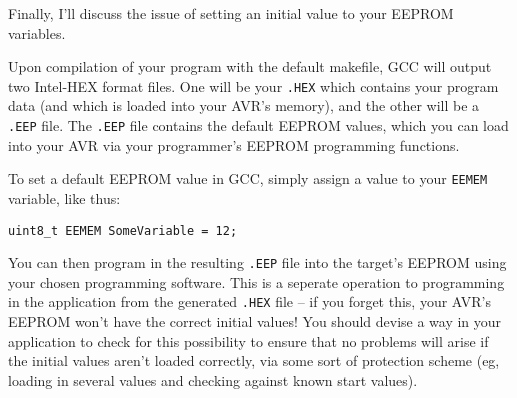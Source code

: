 \documentclass[a4paper,oneside,notitlepage]{book}
\begin{document}
Finally, I'll discuss the issue of setting an initial value to your EEPROM variables.

Upon compilation of your program with the default makefile, GCC will output two Intel-HEX format files. One will be your \texttt{.HEX} which contains your program data (and which is loaded into your AVR's memory), and the other will be a \texttt{.EEP} file. The \texttt{.EEP} file contains the default EEPROM values, which you can load into your AVR via your programmer's EEPROM programming functions.

To set a default EEPROM value in GCC, simply assign a value to your \lstinline{EEMEM} variable, like thus:

\begin{center}
\begin{lstlisting}
uint8_t EEMEM SomeVariable = 12;
\end{lstlisting}
\end{center}

You can then program in the resulting \texttt{.EEP} file into the target's EEPROM using your chosen programming software. This is a seperate operation to programming in the application from the generated \texttt{.HEX} file -- if you forget this, your AVR's EEPROM won't have the correct initial values! You should devise a way in your application to check for this possibility to ensure that no problems will arise if the initial values aren't loaded correctly, via some sort of protection scheme (eg, loading in several values and checking against known start values).
\end{document}
